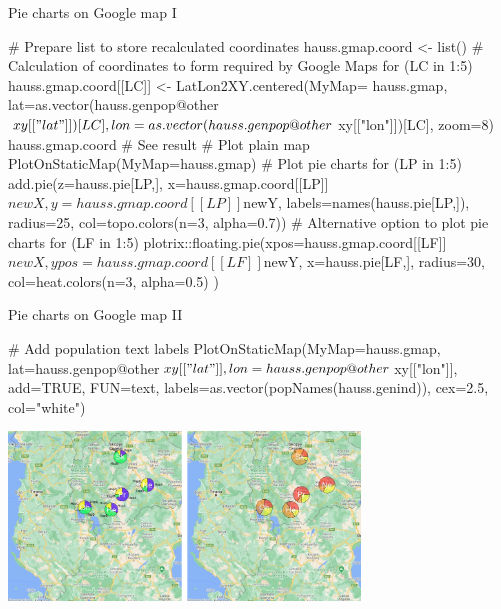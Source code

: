 \documentclass[compress, xelatex, 11pt, xcolor=svgnames, aspectratio=169,
	hyperref={
		bookmarks=true,
		unicode=true,
		colorlinks=true,
		pdftitle={Molecular data in R},
		plainpages=false,
		pdfauthor={Vojtech Zeisek},
		pdfsubject={Course about phylogeny and evolution in R},
		pdfcreator={XeLaTeX},
		pdfkeywords={R, evolution, phylogeny, molecular data},
		linkcolor=Crimson, %
		anchorcolor=Magenta, %
		citecolor=Magenta, %
		filecolor=Magenta, %
		menucolor=Magenta, %
		urlcolor=DodgerBlue, %
		},
	url={hyphens, lowtilde} %
	]{beamer}
\begin{document}
\begin{frame}[fragile]{Pie charts on Google map I}
	\begin{spluscode}
    # Prepare list to store recalculated coordinates
    hauss.gmap.coord <- list()
    # Calculation of coordinates to form required by Google Maps
    for (LC in 1:5) { hauss.gmap.coord[[LC]] <- LatLon2XY.centered(MyMap=
      hauss.gmap, lat=as.vector(hauss.genpop@other$xy[["lat"]])[LC],
      lon=as.vector(hauss.genpop@other$xy[["lon"]])[LC], zoom=8) }
    hauss.gmap.coord # See result
    # Plot plain map
    PlotOnStaticMap(MyMap=hauss.gmap)
    # Plot pie charts
    for (LP in 1:5) { add.pie(z=hauss.pie[LP,], x=hauss.gmap.coord[[LP]]
      $newX, y=hauss.gmap.coord[[LP]]$newY, labels=names(hauss.pie[LP,]),
      radius=25, col=topo.colors(n=3, alpha=0.7)) }
    # Alternative option to plot pie charts
    for (LF in 1:5) { plotrix::floating.pie(xpos=hauss.gmap.coord[[LF]]
      $newX, ypos=hauss.gmap.coord[[LF]]$newY, x=hauss.pie[LF,], radius=30,
      col=heat.colors(n=3, alpha=0.5) ) }
	\end{spluscode}
\end{frame}

\begin{frame}[fragile]{Pie charts on Google map II}
	\begin{spluscode}
    # Add population text labels
    PlotOnStaticMap(MyMap=hauss.gmap, lat=hauss.genpop@other$xy[["lat"]],
      lon=hauss.genpop@other$xy[["lon"]], add=TRUE, FUN=text,
      labels=as.vector(popNames(hauss.genind)), cex=2.5, col="white")
	\end{spluscode}
	\begin{center}
		\includegraphics[height=4.5cm]{map_pie_google.jpg}
	\end{center}
\end{frame}
\end{document}
